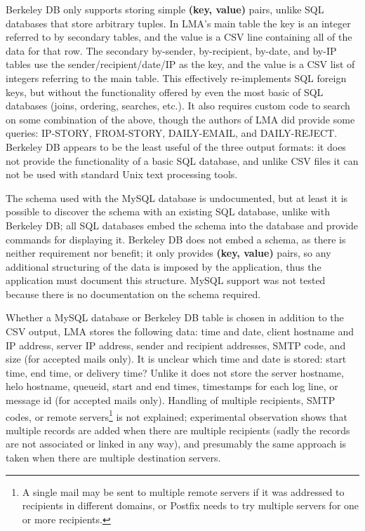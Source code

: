 Berkeley DB only supports storing simple \textbf{(key, value)} pairs,
unlike \gls{SQL} databases that store arbitrary tuples.  In \gls{LMA}'s
main table the key is an integer referred to by secondary tables, and the
value is a \gls{CSV} line containing all of the data for that row.  The
secondary by-sender, by-recipient, by-date, and by-\gls{IP} tables use the
sender/recipient/date/\gls{IP} as the key, and the value is a \gls{CSV}
list of integers referring to the main table.  This effectively
re-implements \gls{SQL} foreign keys, but without the functionality offered
by even the most basic of \gls{SQL} databases (joins, ordering, searches,
etc.).  It also requires custom code to search on some combination of the
above, though the authors of \gls{LMA} did provide some queries: IP-STORY,
FROM-STORY, DAILY-EMAIL, and DAILY-REJECT\@.  Berkeley DB appears to be the
least useful of the three output formats: it does not provide the
functionality of a basic \gls{SQL} database, and unlike \gls{CSV} files it
can not be used with standard Unix text processing tools.

The schema used with the MySQL database is undocumented, but at least it is
possible to discover the schema with an existing \gls{SQL} database, unlike with
Berkeley DB\@; all \gls{SQL} databases embed the schema into the database
and provide commands for displaying it.  Berkeley DB does not embed a
schema, as there is neither requirement nor benefit; it only provides
\textbf{(key, value)} pairs, so any additional structuring of the data is
imposed by the application, thus the application must document this
structure.  MySQL support was not tested because there is no documentation
on the schema required.

Whether a MySQL database or Berkeley DB table is chosen in addition to the
\gls{CSV} output, \gls{LMA} stores the following data: time and date,
client hostname and \gls{IP} address, server \gls{IP} address, sender and
recipient addresses, \gls{SMTP} code, and size (for accepted mails only).
It is unclear which time and date is stored: start time, end time, or
delivery time?  Unlike \parsername{} it does not store the server hostname,
helo hostname, queueid, start and end times, timestamps for each log line,
or message id (for accepted mails only).  Handling of multiple recipients,
\gls{SMTP} codes, or remote servers\footnote{A single mail may be sent to
multiple remote servers if it was addressed to recipients in different
domains, or Postfix needs to try multiple servers for one or more
recipients.} is not explained; experimental observation shows that multiple
records are added when there are multiple recipients (sadly the records are
not associated or linked in any way), and presumably the same approach is
taken when there are multiple destination servers.

